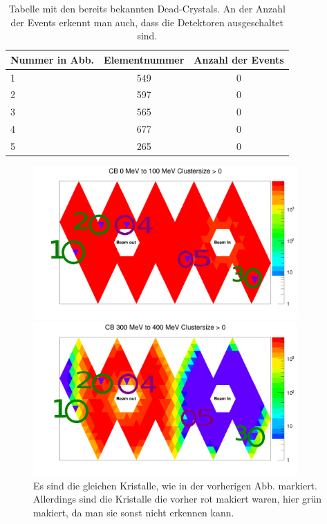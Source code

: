 \documentclass[a4paper,11pt,oneside,final,german,openbib,pdftex]{scrbook}
\begin{document}
{\begin{table}[h!]
	\centering
	
\begin{tabular}{|l|c|c|}
	\hline
	Nummer in Abb. & Elementnummer&Anzahl der Events \\
	\hline
	1 & 549 &0 \\
	\hline
	2 & 597 &0 \\
	\hline
	3 & 565& 0\\
	\hline
	4 & 677& 0\\
	\hline
	5 & 265& 0\\
	\hline
\end{tabular}
		

	\caption[Bereits bekannte Dead-Crystals]{Tabelle mit den bereits bekannten Dead-Crystals. An der Anzahl der Events erkennt man auch, dass die Detektoren ausgeschaltet sind.}
	
\end{table}


\begin{figure}[h!]
	\centering
	\begin{minipage}{0.45\textwidth}
		\centering
		\includegraphics[width=0.9\textwidth]{NewCalib/Strahlzeit2014/ClusterSizeNew/20172404MCClustersize0Map100MeV}
		
	\end{minipage}
	\hfill
	\begin{minipage}{0.45\textwidth}
		\centering
		\includegraphics[width=0.9\textwidth]{NewCalib/Strahlzeit2014/ClusterSizeNew/20172404MCClustersize0Map400MeV}
	\end{minipage}
	\caption[Simulation: Symmetrische Photonen; Markierte Dead-Crystals]{ Es sind die gleichen Kristalle, wie in der vorherigen Abb. markiert. Allerdings sind die Kristalle die vorher rot makiert waren, hier gr\"un makiert, da man sie sonst nicht erkennen kann. }
\end{figure}



}
\end{document}
